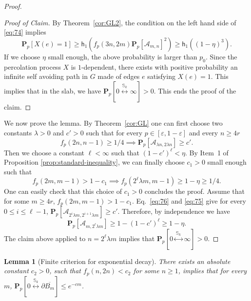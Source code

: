 \documentclass[12pt, twoside,a4paper,reqno]{amsart}
\theoremstyle{plain}
\newtheorem{lemma}[theorem]{Lemma}
\theoremstyle{remark}
\theoremstyle{definition}
\newcommand{\eps}{\varepsilon}
\newcommand{\PP}{\mathbf{P}}
\newcommand{\Pp}[1]{\PP_p \left [ #1 \right ]}
\newcommand{\lr}[1][]{\overset{\:#1\:}\longleftrightarrow}
\newcommand{\ol}{\overline}
\begin{document}
\begin{proof}
\begin{proof}[Proof of Claim]
By Theorem~\ref{cor:GL2}, the condition on the left hand side of \eqref{eq:74}
 implies
\begin{equation}
\mathbf{P}_{p}[ X(e)=1] \ge \mathsf h_1(f_p(3n, 2m)\Pp{\mathcal A_{m,n}}^2)\geq  \mathsf h_1((1-\eta)^3). \label{eq:3}
\end{equation}%
If we choose $\eta$ small enough, the above probability is larger than $p_0$.
Since the percolation process $X$ is $1$-dependent, there exists with positive
probability an infinite self avoiding path in $G$ made of edges $e$ satisfying
$X(e)=1$. This implies that in the slab, we have \mbox{$\Pp%
  {0\overset{\mathbb{S}_{k}}{\longleftrightarrow }\infty}>0$}. This ends the
proof of the claim.
\end{proof}
We now prove the lemma. By Theorem~\ref{cor:GL} one can first choose two
constants $\lambda>0$
and $c'>0$ such that for every $p\in[\eps,1-\eps]$ and every $n\ge 4r$ 
\begin{equation}
  \label{eq:75}
    f_p(2n,n-1)\ge 1/4 \implies \Pp{\mathcal A_{\lambda n,2\lambda n}} \ge c'.
\end{equation}
Then we choose a constant $\ell <\infty$ such that $(1-c')^\ell <\eta$. By
Item~1 of Proposition \ref{prop:standard-inequality}, we can finally choose
$c_1>0$ small enough such that
\begin{equation}
  \label{eq:76}
  f_p(2m,m-1)>1-c_1 \implies f_p(2^\ell\lambda m,m-1)\ge 1-\eta\ge 1/4.
\end{equation}
One can easily check that this choice of $c_1>0$ concludes the proof. Assume
that for some $m\ge 4r$, $f_p(2m,m-1)>1-c_1$. Eq.~\eqref{eq:76} and \eqref{eq:75}
give for every $0\le i\le \ell-1$, $\Pp{\mathcal A_{2^i\lambda m,2^{i+1}\lambda
    m}} \ge c'$.  Therefore, by independence we have
  \begin{equation}
    \label{eq:58}
    \Pp{\mathcal A_{m,2^\ell \lambda m}} \ge 1-(1-c')^\ell\ge  1-\eta.
  \end{equation}
  The claim above applied to $n=2^\ell \lambda m$ implies that $\mathbf{P}_p\left[ 0\lr[\mathbb{S}_{k}]\infty \right] >0$.


 
\end{proof}

\begin{lemma}[Finite criterion for exponential decay]
\label{lem:FC2} There exists an absolute constant $c_{2}>0$, such that $%
f_p(n,2n)<c_{2}$ for some $n\geq 1$, implies that for every $m$, $\mathbf{P}_{p}%
\left[ 0\overset{\mathbb{S}_{k}}{\longleftrightarrow }\partial \ol{B _{m}}%
\right] \leq e^{-cm}$. %
\end{lemma}
\end{document}
